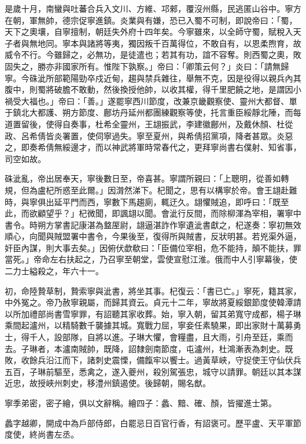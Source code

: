 \begin{pinyinscope}
 是歲十月，南蠻與吐蕃合兵入文川、方維、邛郲，覆沒州縣，民逃匿山谷中。寧方在朝，軍無帥，德宗促寧進鎮。炎業與有嫌，恐已入蜀不可制，即說帝曰：「蜀，天下之奧壤，自寧擅制，朝廷失外府十四年矣。今寧雖來，以全師守蜀，賦稅入天子者與無地同。寧本與諸將等夷，獨因叛千百萬得位，不敢自有，以恩柔煦育，故威令不行。今雖歸之，必無功，是徒遣也；若其有功，誼不容奪。則西蜀之奧，敗固失之，勝亦非國家所有。惟陛下孰察。」帝曰：「卿策云何？」炎曰：「請無歸寧。今硃泚所部範陽勁卒戍近甸，趨與禁兵雜往，舉無不克，因是役得以親兵內其腹中，則蜀將破膽不敢動，然後換授他帥，以收其權，得千里肥饒之地，是謂因小禍受大福也。」帝曰：「善。」遂罷寧西川節度，改兼京畿觀察使、靈州大都督、單于鎮北大都護、朔方節度、鄜坊丹延州都團練觀察等使，托言重臣綏靜北陲，而每道置留後，使得自奏事，杜希全靈州，王翃振武，李建徽鄜州，及戴休顏、杜從政、呂希倩皆炎署置，使伺寧過失。寧至夏州，與希倩招黨項，降者甚眾。炎惡之，即奏希倩無綏邊才，而以神武將軍時常春代之，更拜寧尚書右僕射、知省事，司空如故。



 硃泚亂，帝出居奉天，寧後數日至，帝喜甚。寧謂所親曰：「上聰明，從善如轉規，但為盧杞所惑至此爾。」因潸然涕下。杞聞之，思有以構寧於帝。會王翃赴難時，與寧俱出延平門而西，寧數下馬趨廁，輒迂久。翃懼賊追，即呼曰：「既至此，而欲顧望乎？」杞微聞，即諷翃以聞。會泚行反間，而除柳渾為宰相，署寧中書令。時朔方掌書記康湛為盩厔尉，翃逼湛詐作寧遺泚書獻之，杞遂奏：寧初無效順心，向聞與賊盟署中書令，今果後至，復得所與賊書，反狀明甚。若兇渠外逼，奸臣內謀，則大事去矣。」因俯伏歔欷曰：「臣備位宰相，危不能持，顛不能扶，罪當死。」帝命左右扶起之，乃召寧至朝堂，雲使宣慰江淮。俄而中人引寧幕後，使二力士縊殺之，年六十一。



 初，命陸贄草制，贄索寧與泚書，將坐其事。杞復云：「書已亡。」寧死，籍其家，中外冤之。帝乃赦寧親屬，而歸其資云。貞元十二年，寧故將夏綏銀節度使韓潭請以所加禮部尚書雪寧罪，有詔聽其家收葬。始，寧入朝，留其弟寬守成都，楊子琳乘間起瀘州，以精騎數千襲據其城。寬戰力屈，寧妾任素驍果，即出家財十萬募勇士，得千人，設部隊，自將以進。子琳大懼，會糧盡，且大雨，引舟至廷，乘而去。子琳者，本瀘南賊帥，既降，詔隸劍南節度，屯瀘州，杜鴻漸表為刺史。既敗，收餘兵沿江而下，諸刺史震慄，備餼牢以饗士。過黃草峽，守捉使王守仙伏兵五百，子琳前驅至，悉禽之，遂入夔州，殺別駕張忠，城守以請罪。朝廷以其本謀近忠，故授峽州刺史，移澧州鎮遏使。後歸朝，賜名猷。



 寧季弟密，密子繪，俱以文辭稱。繪四子：蠡、黯、確、顏，皆擢進士第。



 蠡字越卿，開成中為戶部侍郎，白罷忌日百官行香，有詔褒可。歷平盧、天平軍節度使，終尚書左丞。




\end{pinyinscope}
